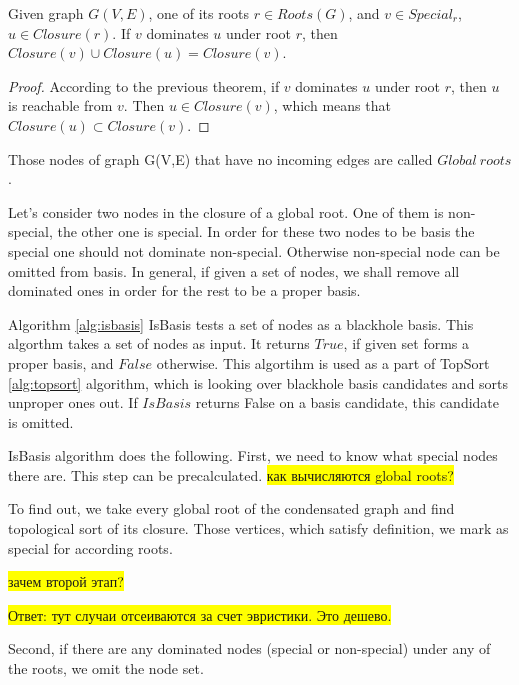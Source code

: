 \documentclass{svproc}
\newcommand{\FIXME}[1]{ %
	\colorbox{yellow}{#1}
}
\newcommand{\FIXME}[1]{ %
}
\begin{document}
\begin{theorem}
   Given graph $G(V,E)$, one of its roots $r \in Roots(G)$, and $v \in Special_r$, $u \in Closure(r)$. 
   If $v$ dominates $u$ under root $r$, then $Closure(v) \cup Closure(u) = Closure(v)$.
\end{theorem}
\begin{proof}
    According to the previous theorem, if $v$ dominates $u$ under root $r$, then $u$ is reachable from $v$. Then $u \in Closure(v)$,
    which means that $Closure(u) \subset Closure(v)$.
\end{proof}

\begin{definition}
	Those nodes of graph G(V,E) that have no incoming edges are called $Global\ roots$. 
\end{definition}


Let's consider two nodes in the closure of a global root. One of them is non-special, the other one is special. In order for these two nodes to be basis
the special one should not dominate non-special. Otherwise non-special node can be omitted from basis.
In general, if given a set of nodes, we shall remove all dominated ones in order for the rest to be a proper basis.


Algorithm \ref{alg:isbasis} IsBasis tests a set of nodes as a blackhole basis.
This algorthm takes a set of nodes as input. It returns $True$, if given set forms a proper basis,
and  $False$ otherwise. This algortihm is used as a part of TopSort \ref{alg:topsort} algorithm, which is looking over
blackhole basis candidates and sorts unproper ones out. If $IsBasis$ returns False on a basis candidate, this candidate is omitted.

IsBasis algorithm does the following.
First, we need to know what special nodes there are. This step can be precalculated. 
\FIXME{как вычисляются global roots?}

To find out, we take every global root of the condensated graph and find topological sort of its closure.
Those vertices, which satisfy definition, we mark as special for according roots.

\FIXME{зачем второй этап?}
\FIXME{Ответ: тут случаи отсеиваются за счет эвристики. Это дешево.}

Second, if there are any dominated nodes (special or non-special) under any of the roots, we omit the node set.
\end{document}
